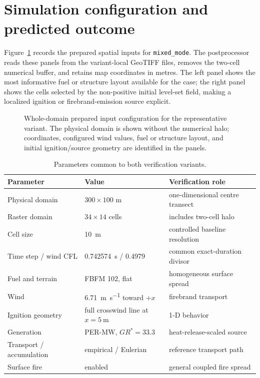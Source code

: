 \section{Simulation configuration and predicted outcome}

Figure~\ref{fig:input-configuration} records the prepared spatial inputs for \texttt{mixed\_mode}.
The postprocessor reads these panels from the variant-local GeoTIFF files, removes the
two-cell numerical buffer, and retains map coordinates in metres.  The left panel shows
the most informative fuel or structure layout available for the case; the right panel
shows the cells selected by the non-positive initial level-set field, making a localized
ignition or firebrand-emission source explicit.

\begin{figure}[H]
\centering
{}
\caption{Whole-domain prepared input configuration for the representative variant.  The
physical domain is shown without the numerical halo; coordinates, configured wind values,
fuel or structure layout, and initial ignition/source geometry are identified in the panels.}
\label{fig:input-configuration}
\end{figure}


\begin{table}[htbp]
\centering
\caption{Parameters common to both verification variants.}
\label{tab:common-config}
\begin{tabular}{lll}
\toprule
Parameter & Value & Verification role \\
\midrule
Physical domain & $300\times100$ m & one-dimensional centre transect \\
Raster domain & $34\times14$ cells & includes two-cell halo \\
Cell size & \SI{10}{\metre} & controlled baseline resolution \\
Time step / wind CFL & \SI{0.742574}{\second} / 0.4979 & common exact-duration divisor \\
Fuel and terrain & FBFM 102, flat & homogeneous surface spread \\
Wind & \SI{6.71}{\metre\per\second} toward $+x$ & firebrand transport \\
Ignition geometry & full crosswind line at $x=\SI{5}{\metre}$ & 1-D behavior \\
Generation & PER-MW, $GR^*=33.3$ & heat-release-scaled source \\
Transport / accumulation & empirical / Eulerian & reference transport path \\
Surface fire & enabled & general coupled fire spread \\
\bottomrule
\end{tabular}
\end{table}

